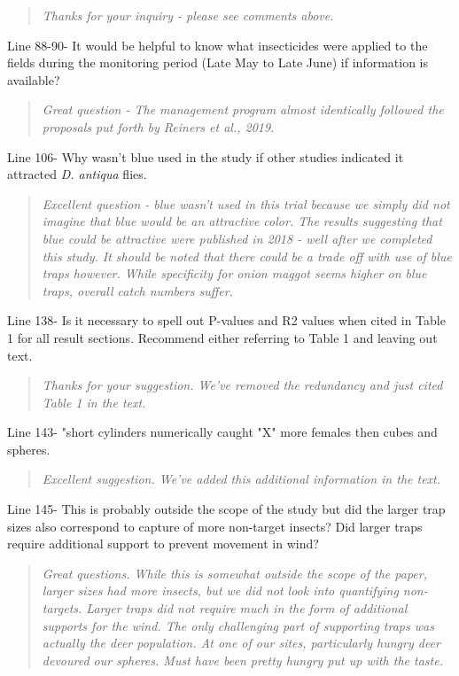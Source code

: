 \documentclass{article}
\begin{document}
\begin{quote}
    \textit{Thanks for your inquiry - please see comments above.}
\end{quote}

Line 88-90- It would be helpful to know what insecticides were applied to the fields during the monitoring period (Late May to Late June) if information is available?

\begin{quote}
    \textit{Great question - The management program almost identically followed the proposals put forth by Reiners et al., 2019. } 
\end{quote}

Line 106- Why wasn't blue used in the study if other studies indicated it attracted \textit{D. antiqua} flies.

\begin{quote}
    \textit{Excellent question - blue wasn't used in this trial because we simply did not imagine that blue would be an attractive color.  The results suggesting that blue could be attractive were published in 2018 - well after we completed this study.  It should be noted that there could be a trade off with use of blue traps however.  While specificity for onion maggot seems higher on blue traps, overall catch numbers suffer. 
    }
\end{quote}

Line 138- Is it necessary to spell out P-values and R2 values when cited in Table 1 for all result sections.  Recommend either referring to Table 1 and leaving out text.


\begin{quote}
    \textit{Thanks for your suggestion.  We've removed the redundancy and just cited Table 1 in the text.  }
\end{quote}


Line 143- "short cylinders numerically caught "X" more females  then cubes and spheres.  

\begin{quote}
    \textit{Excellent suggestion.  We've added this additional information in the text.}
\end{quote}

Line 145- This is probably outside the scope of the study but did the larger trap sizes also correspond to capture of more non-target insects?  Did larger traps require additional support to prevent movement in wind?

\begin{quote}
    \textit{Great questions.  While this is somewhat outside the scope of the paper, larger sizes had more insects, but we did not look into quantifying non-targets.  Larger traps did not require much in the form of additional supports for the wind.  The only challenging part of supporting traps was actually the deer population.  At one of our sites, particularly hungry deer devoured our spheres. Must have been pretty hungry put up with the taste.  }
\end{quote}
\end{document}
